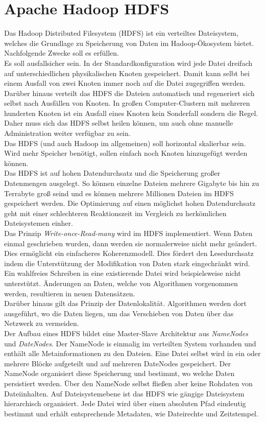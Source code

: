 \section{Apache Hadoop HDFS}
\label{sec:theory_hdfs}
Das Hadoop Distributed Filesystem (HDFS) ist ein verteiltes Dateisystem, welches die Grundlage zu Speicherung von Daten im Hadoop-Ökosystem bietet. Nachfolgende Zwecke soll es erfüllen.\\
Es soll ausfallsicher sein. In der Standardkonfiguration wird jede Datei dreifach auf unterschiedlichen physikalischen Knoten gespeichert. Damit kann selbt bei einem Ausfall von zwei Knoten immer noch auf die Datei zugegriffen werden. Darüber hinaus verteilt das HDFS die Dateien automatisch und regeneriert sich selbst nach Ausfällen von Knoten. In großen Computer-Clustern mit mehreren hunderten Knoten ist ein Ausfall eines Knoten kein Sonderfall sondern die Regel. Daher muss sich das HDFS selbst heilen können, um auch ohne manuelle Administration weiter verfügbar zu sein.\\
Das HDFS (und auch Hadoop im allgemeinen) soll horizontal skalierbar sein. Wird mehr Speicher benötigt, sollen einfach noch Knoten hinzugefügt werden können.\\
Das HDFS ist auf hohen Datendurchsatz und die Speicherung großer Datenmengen ausgelegt.
So können einzelne Dateien mehrere Gigabyte bis hin zu Terrabyte groß seind und es können mehrere Millionen Dateien im HDFS gespeichert werden. Die Optimierung auf einen möglichst hohen Datendurchsatz geht mit einer schlechteren Reaktionszeit im Vergleich zu herkömlichen Dateisystemen einher.\\
Das Prinzip \textit{Write-once-Read-many} wird im HDFS implementiert. Wenn Daten einmal geschrieben wurden, dann werden sie normalerweise nicht mehr geändert. Dies ermöglicht ein einfacheres Koherenzmodell. Dies fördert den Lesedurchsatz indem die Unterstützung der Modifikation von Daten stark eingechränkt wird. Ein wahlfreies Schreiben in eine existierende Datei wird beispielsweise nicht unterstützt. Änderungen an Daten, welche von Algorithmen vorgenommen werden, resultieren in neuen Datensätzen.\\
Darüber hinaus gilt das Prinzip der Datenlokalität. Algorithmen werden dort ausgeführt, wo die Daten liegen, um das Verschieben von Daten über das Netzwerk zu vermeiden.\cite{hdfs_architecture}\\

\noindent
Der Aufbau eines HDFS bildet eine Master-Slave Architektur aus \textit{NameNodes} und \textit{DateNodes}. Der NameNode is einmalig im verteilten System vorhanden und enthält alle Metainformationen zu den Dateien. Eine Datei selbst wird in ein oder mehrere Blöcke aufgeteilt und auf mehreren DateNodes gespeichert. Der NameNode organisiert diese Speicherung und bestimmt, wo welche Daten persistiert werden. Über den NameNode selbst fließen aber keine Rohdaten von Dateiinhalten. Auf Dateisystemebene ist das HDFS wie gängige Dateisystem hierarchisch organisiert. Jede Datei wird über einen absoluten Pfad eindeutig bestimmt und erhält entsprechende Metadaten, wie Dateirechte und Zeitstempel.  \\


